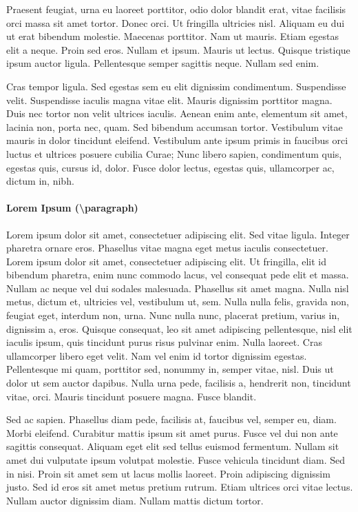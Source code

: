 \documentclass[nochapterpage,bigchapter,linedtoc,longdoc,colorback,accentcolor=tud4c]{tudreport}
\begin{document}
    Praesent feugiat, urna eu laoreet porttitor, odio dolor blandit erat, vitae facilisis orci massa sit amet tortor. Donec orci. Ut fringilla ultricies nisl. Aliquam eu dui ut erat bibendum molestie. Maecenas porttitor. Nam ut mauris. Etiam egestas elit a neque. Proin sed eros. Nullam et ipsum. Mauris ut lectus. Quisque tristique ipsum auctor ligula. Pellentesque semper sagittis neque. Nullam sed enim.

    Cras tempor ligula. Sed egestas sem eu elit dignissim condimentum. Suspendisse velit. Suspendisse iaculis magna vitae elit. Mauris dignissim porttitor magna. Duis nec tortor non velit ultrices iaculis. Aenean enim ante, elementum sit amet, lacinia non, porta nec, quam. Sed bibendum accumsan tortor. Vestibulum vitae mauris in dolor tincidunt eleifend. Vestibulum ante ipsum primis in faucibus orci luctus et ultrices posuere cubilia Curae; Nunc libero sapien, condimentum quis, egestas quis, cursus id, dolor. Fusce dolor lectus, egestas quis, ullamcorper ac, dictum in, nibh.

  \paragraph{Lorem Ipsum (\textbackslash paragraph)}

    Lorem ipsum dolor sit amet, consectetuer adipiscing elit. Sed vitae ligula. Integer pharetra ornare eros. Phasellus vitae magna eget metus iaculis consectetuer. Lorem ipsum dolor sit amet, consectetuer adipiscing elit. Ut fringilla, elit id bibendum pharetra, enim nunc commodo lacus, vel consequat pede elit et massa. Nullam ac neque vel dui sodales malesuada. Phasellus sit amet magna. Nulla nisl metus, dictum et, ultricies vel, vestibulum ut, sem. Nulla nulla felis, gravida non, feugiat eget, interdum non, urna. Nunc nulla nunc, placerat pretium, varius in, dignissim a, eros. Quisque consequat, leo sit amet adipiscing pellentesque, nisl elit iaculis ipsum, quis tincidunt purus risus pulvinar enim. Nulla laoreet. Cras ullamcorper libero eget velit. Nam vel enim id tortor dignissim egestas. Pellentesque mi quam, porttitor sed, nonummy in, semper vitae, nisl. Duis ut dolor ut sem auctor dapibus. Nulla urna pede, facilisis a, hendrerit non, tincidunt vitae, orci. Mauris tincidunt posuere magna. Fusce blandit.

    Sed ac sapien. Phasellus diam pede, facilisis at, faucibus vel, semper eu, diam. Morbi eleifend. Curabitur mattis ipsum sit amet purus. Fusce vel dui non ante sagittis consequat. Aliquam eget elit sed tellus euismod fermentum. Nullam sit amet dui vulputate ipsum volutpat molestie. Fusce vehicula tincidunt diam. Sed in nisi. Proin sit amet sem ut lacus mollis laoreet. Proin adipiscing dignissim justo. Sed id eros sit amet metus pretium rutrum. Etiam ultrices orci vitae lectus. Nullam auctor dignissim diam. Nullam mattis dictum tortor.
\end{document}
